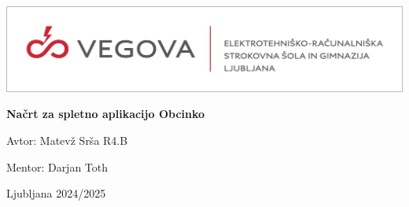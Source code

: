\documentclass[12pt, a4paper]{report}
\newcommand{\theTitle}{Načrt za spletno aplikacijo Obcinko}
\newcommand{\theAuthor}{Avtor: Matevž Srša R4.B}
\newcommand{\theMentor}{Mentor: Darjan Toth}
\newcommand{\theDate}{Ljubljana 2024/2025}
\begin{document}
    \begin{titlepage}
        \includegraphics[width=1\textwidth]{res/logo.jpg}

        \centering
        \vspace*{8cm}
        {\fontsize{35}{2} \textbf{\theTitle}}

        {\fontsize{20}{24} \theAuthor}

        {\fontsize{20}{24} \theMentor}

        {\fontsize{20}{24} \theDate}


    \end{titlepage}
\end{document}
